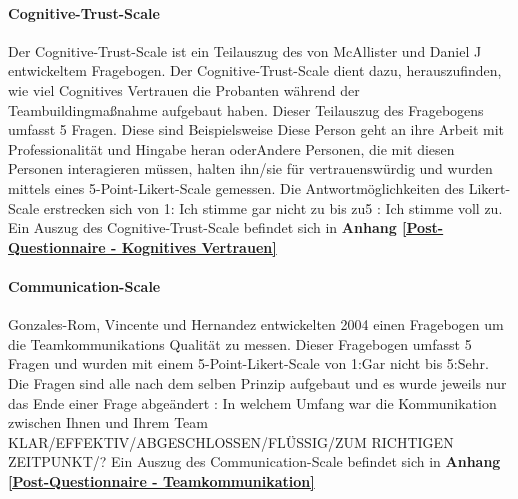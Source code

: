 \documentclass[a4paper,11pt]{article}%
\renewcommand{\\}{\vspace*{0.5\baselineskip} \newline}
\begin{document}
		\paragraph{Cognitive-Trust-Scale}
Der Cognitive-Trust-Scale ist ein Teilauszug des von McAllister und Daniel J \citep[p.37]{mcallister1995affect} entwickeltem Fragebogen. Der Cognitive-Trust-Scale dient dazu, herauszufinden, wie viel Cognitives Vertrauen die Probanten während der Teambuildingmaßnahme aufgebaut haben. Dieser Teilauszug des Fragebogens umfasst 5 Fragen. Diese sind Beispielsweise \dq{}Diese Person geht an ihre Arbeit mit Professionalität und Hingabe heran \dq{} oder\dq{}Andere Personen, die mit diesen Personen interagieren müssen, halten ihn/sie für vertrauenswürdig und wurden mittels eines 5-Point-Likert-Scale gemessen. Die Antwortmöglichkeiten des Likert-Scale erstrecken sich von \dq{}1: Ich stimme gar nicht zu \dq{} bis zu\dq{}5 : Ich stimme voll zu. 
Ein Auszug des Cognitive-Trust-Scale befindet sich in \textbf{Anhang \ref{Post-Questionnaire - Kognitives Vertrauen}}

  


		\paragraph{Communication-Scale}
Gonzales-Rom, Vincente und Hernandez \citep[p.1049]{gonzalez2014climate} entwickelten 2004 einen Fragebogen um die Teamkommunikations Qualität zu messen. Dieser Fragebogen umfasst 5 Fragen und wurden mit einem 5-Point-Likert-Scale von \dq{}1:Gar nicht\dq{} bis \dq{}5:Sehr\dq{}. Die Fragen sind alle nach dem selben Prinzip aufgebaut und es wurde jeweils nur das Ende einer Frage abgeändert : \dq{}In welchem Umfang war die Kommunikation zwischen Ihnen und Ihrem Team KLAR/EFFEKTIV/ABGESCHLOSSEN/FLÜSSIG/ZUM RICHTIGEN ZEITPUNKT/?\dq{} 
Ein Auszug des Communication-Scale befindet sich in \textbf{Anhang \ref{Post-Questionnaire - Teamkommunikation}}
\end{document}
